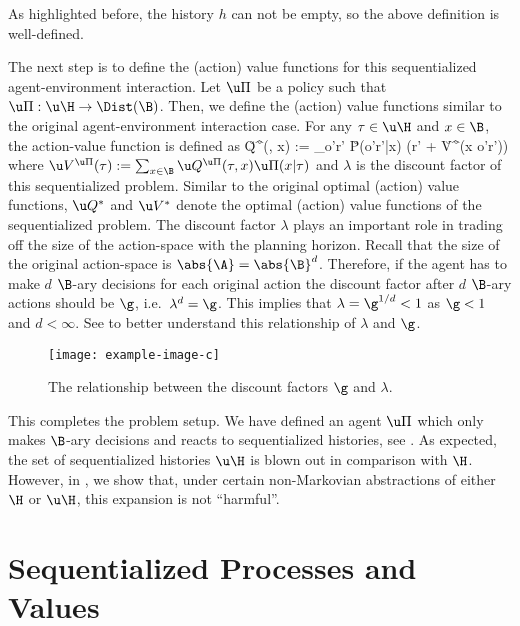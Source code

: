 \documentclass{article} %
\begin{document}
As highlighted before, the history $h$ can not be empty, so the above definition is well-defined.

The next step is to define the (action) value functions for this sequentialized agent-environment interaction. Let $\u \Pi$ be a policy such that $\u \Pi : \u \H \to \Dist(\B)$. Then, we define the (action) value functions similar to the original agent-environment interaction case. For any $\tau \in \u \H$ and $x \in \B$, the action-value function is defined as
\beq
\u Q^{\u \Pi}(\tau, x) := \sum_{o'r'} \u P(o'r'|\tau x) \left(r' + \lambda \u V^{\u \Pi}(\tau x o'r')\right)\label{eq:ube}
\eeq
where $\u V^{\u \Pi}(\tau) := \sum_{x \in \B} \u Q^{\u \Pi}(\tau, x)\u \Pi(x|\tau)$ and $\lambda$ is the discount factor of this sequentialized problem. Similar to the original optimal (action) value functions, $\u Q^*$ and $\u V^*$ denote the optimal (action) value functions of the sequentialized problem. The discount factor $\lambda$ plays an important role in trading off the size of the action-space with the planning horizon. Recall that the size of the original action-space is $\abs{\A} = \abs{\B}^d$. Therefore, if the agent has to make $d$ $\B$-ary decisions for each original action the discount factor after $d$ $\B$-ary actions should be $\g$, i.e.\ $\lambda^d = \g$. This implies that $\lambda = \g^{1/d} < 1$ as $\g < 1$ and $d < \infty$.
\ifshort\else See  to better understand this relationship of $\lambda$ and $\g$.


\begin{figure}[!ht]
\centering
\texttt{[image: example-image-c]}
\caption{The relationship between the discount factors $\g$ and $\lambda$.}
\label{fig:relationship-discount-factors}
\end{figure}
\fi

This completes the problem setup. We have defined an agent $\u \Pi$ which only makes $\B$-ary decisions and reacts to sequentialized histories, see . As expected, the set of sequentialized histories $\u \H$ is blown out in comparison with $\H$. However, in , we show that, under certain non-Markovian abstractions of either $\H$ or $\u \H$, this expansion is not ``harmful''.


\section{Sequentialized Processes and Values}\label{sec:bin-esa}
\end{document}
